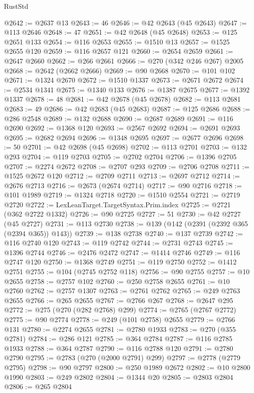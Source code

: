 \begin{lexlean}{RustStd}
\begin{coremodule}
@2642 := @2637 @13
@2643 := 46
@2646 := @42 @2643 (@45 @2643)
@2647 := @113 @2646
@2648 := 47
@2651 := @42 @2648 (@45 @2648)
@2653 := @125 @2651 @133
@2654 := @116 @2653
@2655 := @1510 @13
@2657 := @1525 @2655 @120
@2659 := @116 @2657 @121
@2660 := @2654 @2659
@2661 := @2647 @2660
@2662 := @266 @2661
@2666 := @270 (@342 @246 @267) @2005
@2668 := @2642 (@2662 @2666)
@2669 := @90 @2668
@2670 := @101 @102
@2671 := @1324 @2670
@2672 := @1510 @1337
@2673 := @2671 @2672
@2674 := @2534 @1341
@2675 := @1340 @133
@2676 := @1387 @2675
@2677 := @1392 @1337
@2678 := 48
@2681 := @42 @2678 (@45 @2678)
@2682 := @113 @2681
@2683 := 49
@2686 := @42 @2683 (@45 @2683)
@2687 := @125 @2686
@2688 := @286 @2548
@2689 := @132 @2688
@2690 := @2687 @2689
@2691 := @116 @2690
@2692 := @1368 @120
@2693 := @2567 @2692
@2694 := @2691 @2693
@2695 := @2682 @2694
@2696 := @1348 @2695
@2697 := @2677 @2696
@2698 := 50
@2701 := @42 @2698 (@45 @2698)
@2702 := @113 @2701
@2703 := @132 @293
@2704 := @119 @2703
@2705 := @2702 @2704
@2706 := @1396 @2705
@2707 := @2274 @2672
@2708 := @2707 @293
@2709 := @2706 @2708
@2711 := @1525 @2672 @120
@2712 := @2709 @2711
@2713 := @2697 @2712
@2714 := @2676 @2713
@2716 := @2673 (@2674 @2714)
@2717 := @90 @2716
@2718 := @101 @1989
@2719 := @1324 @2718
@2720 := @1510 @2554
@2721 := @2719 @2720
@2722 := LexLeanTarget.TargetSyntax.Prim.index
@2725 := @2721 (@362 @2722 @1332)
@2726 := @90 @2725
@2727 := 51
@2730 := @42 @2727 (@45 @2727)
@2731 := @113 @2730
@2738 := @139 (@142 (@2391 (@2392 @365 (@2394 @365)) @143))
@2739 := @138 @2738
@2740 := @137 @2739
@2742 := @116 @2740 @120
@2743 := @119 @2742
@2744 := @2731 @2743
@2745 := @1396 @2744
@2746 := @2476 @2472
@2747 := @1414 @2746
@2749 := @116 @2747 @120
@2750 := @1368 @2749
@2751 := @119 @2750
@2752 := @1412 @2751
@2755 := @104 (@2745 @2752 @118)
@2756 := @90 @2755
@2757 := @10 @2655
@2758 := @2757 @102
@2760 := @250 @2758 @2655
@2761 := @10 @2760
@2762 := @2757 @1307
@2763 := @2761 @2762
@2765 := @249 @2763 @2655
@2766 := @265 @2655
@2767 := @2766 @267
@2768 := @2647 @295
@2772 := @275 (@270 (@282 @2768) @299)
@2774 := @2765 (@2767 @2772)
@2775 := @90 @2774
@2778 := @249 (@101 @2758) @2655
@2779 := @2766 @131
@2780 := @2274 @2655
@2781 := @2780 @1933
@2783 := @270 (@355 @2781)
@2784 := @286 @121
@2785 := @364 @2784
@2787 := @116 @2785 @1933
@2788 := @364 @2787
@2790 := @116 @2788 @120
@2791 := @2780 @2790
@2795 := @2783 (@270 (@2000 @2791) @299)
@2797 := @2778 (@2779 @2795)
@2798 := @90 @2797
@2800 := @250 @1989 @2672
@2802 := @10 @2800 @1990
@2803 := @249 @2802
@2804 := @1344 @20
@2805 := @2803 @2804
@2806 := @265 @2804

\end{coremodule}
\end{lexlean}
